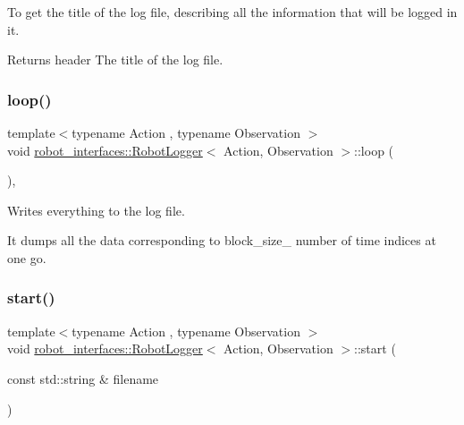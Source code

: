 To get the title of the log file, describing all the information that will be logged in it. 

\begin{DoxyReturn}{Returns}
header The title of the log file. 
\end{DoxyReturn}
\mbox{\label{classrobot__interfaces_1_1RobotLogger_ad21b7aa8531a57bb3740ac5282093815}} 
\subsubsection{\texorpdfstring{loop()}{loop()}}
{\footnotesize\ttfamily template$<$typename Action , typename Observation $>$ \\
void \hyperlink{classrobot__interfaces_1_1RobotLogger}{robot\+\_\+interfaces\+::\+Robot\+Logger}$<$ Action, Observation $>$\+::loop (\begin{DoxyParamCaption}{ }\end{DoxyParamCaption})\hspace{0.3cm}{\ttfamily [inline]}, {\ttfamily [private]}}



Writes everything to the log file. 

It dumps all the data corresponding to block\+\_\+size\+\_\+ number of time indices at one go. \mbox{\label{classrobot__interfaces_1_1RobotLogger_a7a1b50c75aab3255ac7e6d412de833d1}} 
\subsubsection{\texorpdfstring{start()}{start()}}
{\footnotesize\ttfamily template$<$typename Action , typename Observation $>$ \\
void \hyperlink{classrobot__interfaces_1_1RobotLogger}{robot\+\_\+interfaces\+::\+Robot\+Logger}$<$ Action, Observation $>$\+::start (\begin{DoxyParamCaption}\item[{const std\+::string \&}]{filename }\end{DoxyParamCaption})\hspace{0.3cm}{\ttfamily [inline]}}



